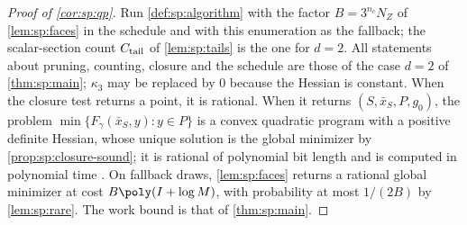 \begin{proof}[Proof of \cref{cor:sp:qp}]
Run \cref{def:sp:algorithm} with the factor $B=3^{n_c}N_Z$ of
\cref{lem:sp:faces} in the schedule and with this enumeration as the
fallback; the scalar-section count $C_{\rm tail}$ of \cref{lem:sp:tails} is
the one for $d=2$. All statements about pruning, counting, closure and the
schedule are those of the case $d=2$ of \cref{thm:sp:main}; $\kappa_3$ may be
replaced by $0$ because the Hessian is constant. When the closure test returns
a point, it is rational. When it returns $(S,\bar x_S,P,g_0)$, the problem
$\min\{F_\gamma(\bar x_S,y):y\in P\}$ is a convex quadratic program with a
positive definite Hessian, whose unique solution is the global minimizer
by \cref{prop:sp:closure-sound}; it is rational of polynomial bit length
and is computed in polynomial time \citep{kozlov1980-the-polynomial-solvability-of-convex}. On
fallback draws, \cref{lem:sp:faces} returns a rational global minimizer at
cost $B\poly(I+\log M)$, with probability at most $1/(2B)$ by
\cref{lem:sp:rare}. The work bound is that of \cref{thm:sp:main}.
\end{proof}
